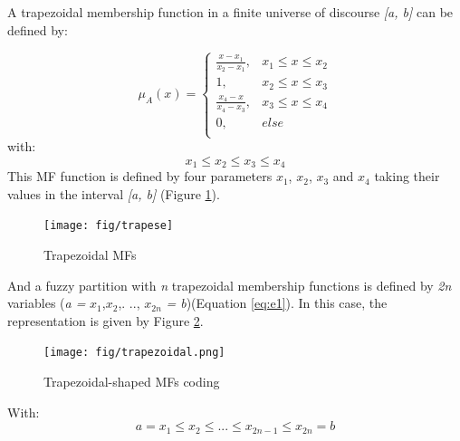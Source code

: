 \documentclass[conference]{IEEEtran}
\begin{document}


A trapezoidal membership function in a finite universe of discourse \textit{[a, b]} can be defined by:

\begin{equation}
\mu_{A}(x)= \left \{
\begin{array}{ll}
\frac{x - x_{1}}{x_{2} - x_{1}},& x_{1} \leq x \leq x_{2}\\
1 , &x_{2} \leq x \leq x_{3}\\
\frac{x_{4} - x}{x_{4} - x_{3}},& x_{3} \leq x \leq x_{4}\\
0        ,& else\\	
\end{array}
\right.
\label{eq:trapmf}
\end{equation}
with:
\begin{equation}
x_{1} \leq x_{2} \leq x_{3} \leq x_{4}
\end{equation}
This MF function is defined by four parameters $x_{1}$, $x_{2}$,
$x_{3}$ and $x_{4}$ taking their values in the interval \textit{[a,
  b]} (Figure \ref{fig:trapeze}).

\begin{figure}[!ht] 
	\begin{center}
		\texttt{[image: fig/trapese]}
		\caption {Trapezoidal MFs}
		\label{fig:trapeze}
	\end{center}
\end{figure}
And a fuzzy partition with \textit{n} trapezoidal membership functions
is defined by \textit{2n} variables (\textit{a =} $ x_{1}$,$x_{2}
$,. .., $x_{2n} $ \textit {= b})(Equation \ref{eq:e1}). In this case,
the representation is given by Figure \ref{fig:at}.
%
\begin{figure}[!ht] 
	\begin{center}
		\texttt{[image: fig/trapezoidal.png]}
		\caption {Trapezoidal-shaped MFs coding}
		\label{fig:at}
	\end{center}
\end{figure}
%
With:
\begin{equation}
a = x_{1} \leq x_{2} \leq...\leq x_{2n-1} \leq x_{2n}=b 	
\end{equation}		
\end{document}
